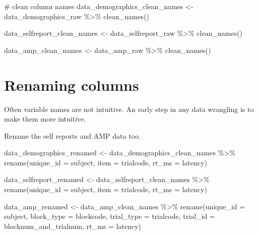 \documentclass[
  letterpaper,
  DIV=11,
  numbers=noendperiod]{scrreprt}
\newenvironment{Shaded}{\begin{snugshade}}{\end{snugshade}}
\newcommand{\AttributeTok}[1]{\textcolor[rgb]{0.40,0.45,0.13}{#1}}
\newcommand{\CommentTok}[1]{\textcolor[rgb]{0.37,0.37,0.37}{#1}}
\newcommand{\FunctionTok}[1]{\textcolor[rgb]{0.28,0.35,0.67}{#1}}
\newcommand{\NormalTok}[1]{\textcolor[rgb]{0.00,0.23,0.31}{#1}}
\newcommand{\OtherTok}[1]{\textcolor[rgb]{0.00,0.23,0.31}{#1}}
\newcommand{\SpecialCharTok}[1]{\textcolor[rgb]{0.37,0.37,0.37}{#1}}
\begin{document}
\begin{Shaded}
\begin{Highlighting}[]
\CommentTok{\# clean column names}
\NormalTok{data\_demographics\_clean\_names }\OtherTok{\textless{}{-}}\NormalTok{ data\_demographics\_raw }\SpecialCharTok{\%\textgreater{}\%}
  \FunctionTok{clean\_names}\NormalTok{() }

\NormalTok{data\_selfreport\_clean\_names }\OtherTok{\textless{}{-}}\NormalTok{ data\_selfreport\_raw }\SpecialCharTok{\%\textgreater{}\%}
  \FunctionTok{clean\_names}\NormalTok{() }

\NormalTok{data\_amp\_clean\_names }\OtherTok{\textless{}{-}}\NormalTok{ data\_amp\_raw }\SpecialCharTok{\%\textgreater{}\%}
  \FunctionTok{clean\_names}\NormalTok{() }
\end{Highlighting}
\end{Shaded}

\section{Renaming columns}\label{renaming-columns}

Often variable names are not intuitive. An early step in any data
wrangling is to make them more intuitive.

Rename the self reports and AMP data too.

\begin{Shaded}
\begin{Highlighting}[]
\NormalTok{data\_demographics\_renamed }\OtherTok{\textless{}{-}}\NormalTok{ data\_demographics\_clean\_names }\SpecialCharTok{\%\textgreater{}\%}
  \FunctionTok{rename}\NormalTok{(}\AttributeTok{unique\_id =}\NormalTok{ subject,}
         \AttributeTok{item =}\NormalTok{ trialcode,}
         \AttributeTok{rt\_ms =}\NormalTok{ latency) }

\NormalTok{data\_selfreport\_renamed }\OtherTok{\textless{}{-}}\NormalTok{ data\_selfreport\_clean\_names }\SpecialCharTok{\%\textgreater{}\%}
  \FunctionTok{rename}\NormalTok{(}\AttributeTok{unique\_id =}\NormalTok{ subject,}
         \AttributeTok{item =}\NormalTok{ trialcode,}
         \AttributeTok{rt\_ms =}\NormalTok{ latency) }

\NormalTok{data\_amp\_renamed }\OtherTok{\textless{}{-}}\NormalTok{ data\_amp\_clean\_names }\SpecialCharTok{\%\textgreater{}\%}
  \FunctionTok{rename}\NormalTok{(}\AttributeTok{unique\_id =}\NormalTok{ subject,}
         \AttributeTok{block\_type =}\NormalTok{ blockcode,}
         \AttributeTok{trial\_type =}\NormalTok{ trialcode,}
         \AttributeTok{trial\_id =}\NormalTok{ blocknum\_and\_trialnum,}
         \AttributeTok{rt\_ms =}\NormalTok{ latency) }
\end{Highlighting}
\end{Shaded}
\end{document}

